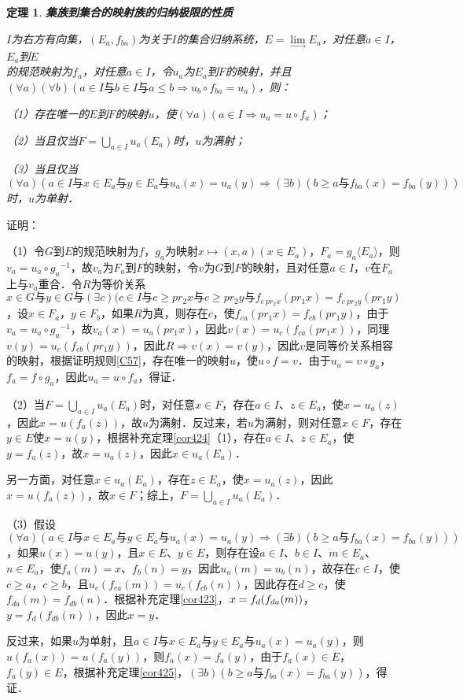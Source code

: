 \documentclass[12pt, a4paper, oneside]{book}
\newtheorem{theo}{定理}
\begin{document}
			\begin{theo}\label{theo184}
				\textbf{集族到集合的映射族的归纳极限的性质}\par
				$I$为右方有向集，$(E_a, f_{ba})$为关于$I$的集合归纳系统，$E= \lim\limits_\to E_a$，对任意$a\in I$，$E_a$到$E$\\的规范映射为$f_a$，对任意$a\in I$，令$u_a$为$E_a$到$F$的映射，并且$(\forall a)(\forall b)(a\in I\text{与}b\in I\text{与}a\leq b\Rightarrow u_b\circ f_{ba}=u_a)$，则：
				\par
				（1）存在唯一的$E$到$F$的映射$u$，使$(\forall a)(a\in I\Rightarrow u_a=u\circ f_a)$；
				\par
				（2）当且仅当$F=\bigcup\limits_{a\in I}u_a(E_a)$时，$u$为满射；
				\par
				（3）当且仅当$(\forall a)(a\in I\text{与}x\in E_a\text{与}y\in E_a\text{与}u_a(x)=u_a(y)\Rightarrow (\exists b)(b\geq a\text{与}f_{ba}(x)=f_{ba}(y)))$时，$u$为单射．
			\end{theo}
			证明：
			\par
			（1）令$G$到$E$的规范映射为$f$，$g_a$为映射$x\mapsto (x, a)(x\in E_a)$，$F_a=g_a\langle E_a\rangle$，则 $v_a=u_a\circ {g_a}^{-1}$，故$v_a$为$F_a$到$F$的映射，令$v$为$G$到$F$的映射，且对任意$a\in I$，$v$在$F_a$上与$v_a$重合．令$R$为等价关系$x\in G\text{与}y\in G \text{与}(\exists c)(c\in I\text{与}c\geq pr_2x\text{与}c\geq pr_2y\text{与}f_{c\ pr_2x}(pr_1x)= f_{c\ pr_2y}(pr_1y)$，设$x\in F_a$，$y\in F_b$，如果$R$为真，则存在$c$，使$f_{ca}(pr_1x)=f_{cb}(pr_1y)$，由于$v_a=u_a\circ {g_a}^{-1}$，故$v_a(x)=u_a(pr_1x)$，因此$v(x)=u_c(f_{ca}(pr_1x))$，同理$v(y)=u_c(f_{cb}(pr_1y))$，因此$R\Rightarrow v(x)=v(y)$，因此$v$是同等价关系相容的映射，根据证明规则\ref{C57}，存在唯一的映射$u$，使$u\circ f=v$．由于$u_a=v\circ g_a$，$f_a=f\circ g_a$，因此$u_a=u\circ f_a$，得证．
			\par
			（2）当$F=\bigcup\limits_{a\in I}u_a(E_a)$时，对任意$x\in F$，存在$a\in I$、$z\in E_a$，使$x=u_a(z)$，因此$x=u(f_a(z))$，故$u$为满射．反过来，若$u$为满射，则对任意$x\in F$，存在$y\in E$使$x=u(y)$，根据补充定理\ref{cor424}（1），存在$a\in I$、$z\in E_a$，使$y=f_a(z)$，故$x=u_a(z)$，因此$x\in u_a(E_a)$．
			\par
			另一方面，对任意$x\in u_a(E_a)$，存在$z\in E_a$，使$x=u_a(z)$，因此$x=u(f_a(z))$，故$x\in F$；综上，$F=\bigcup\limits_{a\in I}u_a(E_a)$．
			\par
			（3）假设$(\forall a)(a\in I\text{与}x\in E_a\text{与}y\in E_a\text{与}u_a(x)=u_a(y)\Rightarrow (\exists b)(b\geq a\text{与}f_{ba}(x)=f_{ba}(y)))$，如果$u(x)=u(y)$，且$x\in E$、$y\in E$，则存在设$a\in I$、$b\in I$、$m\in E_a$、$n\in E_a$，使$f_a(m)=x$、$f_b(n)=y$，因此$u_a(m)=u_b(n)$，故存在$c\in I$，使$c\geq a$，$c\geq b$，且$u_c(f_{ca}(m))=u_c(f_{cb}(n))$，因此存在$d\geq c$，使$f_{da}(m)=f_{db}(n)$．根据补充定理\ref{cor423}，$x=\\f_d(f_{da}(m))$，$y=f_d(f_{db}(n))$，因此$x=y$．
			\par
			反过来，如果$u$为单射，且$a\in I\text{与}x\in E_a\text{与}y\in E_a\text{与}u_a(x)=u_a(y)$，则$u(f_a(x))=u(f_a(y))$，则$f_a(x)= f_a(y)$，由于$f_a(x)\in E$，$f_a(y) \in E$，根据补充定理\ref{cor425}，$(\exists b)(b\geq a\text{与}f_{ba}(x)=f_{ba}(y))$，得证．
			
\end{document}
